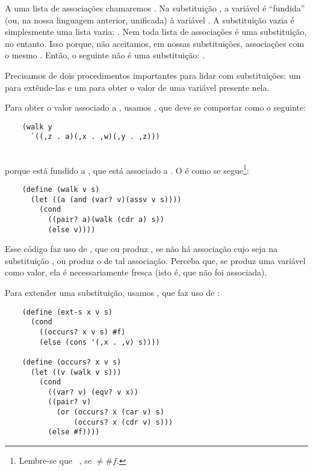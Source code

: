 \documentclass{article}
\begin{document}
  A uma lista de associações chamaremos . Na
  substituição , a variável  é
  ``fundida'' (ou, na nossa linguagem anterior, unificada) à variável
  . A substituição vazia é simplesmente uma lista vazia:
  . Nem toda lista de associações é uma
  substituição, no entanto. Isso porque, não aceitamos, em nossas
  substituições, associações com o mesmo . Então, o
  seguinte não é uma substituição: .

  Precisamos de dois procedimentos importantes para lidar com
  substituições: um para extênde-las e um para obter o valor de uma
  variável presente nela.

  Para obter o valor associado a , usamos ,
  que deve se comportar como o seguinte:
  \begin{lstlisting}
    (walk y
      `((,z . a)(,x . ,w)(,y . ,z)))
  \end{lstlisting}
  \hspace{1cm} \seta\ \\
  porque  está fundido a , que está associado
  a . O  é como se
  segue\footnote{Lembre-se que  \seta\ ,
    se  $\neq \#f$.}:

  \begin{lstlisting}
    (define (walk v s)
      (let ((a (and (var? v)(assv v s))))
        (cond
          ((pair? a)(walk (cdr a) s))
          (else v))))
  \end{lstlisting}

  \noindent Esse código faz uso de , que ou produz
  , se não há associação cujo  seja
   na substituição , ou produz o
   de tal associação. Perceba que, se 
  produz uma variável como valor, ela é necessariamente fresca (isto
  é, que não foi associada).

  Para extender uma substituição, usamos , que faz
  uso de :

  \begin{lstlisting}
    (define (ext-s x v s)
      (cond
        ((occurs? x v s) #f)
        (else (cons '(,x . ,v) s))))

    (define (occurs? x v s)
      (let ((v (walk v s)))
        (cond
          ((var? v) (eqv? v x))
          ((pair? v)
            (or (occurs? x (car v) s)
                (occurs? x (cdr v) s)))
          (else #f))))
  \end{lstlisting}
\end{document}

